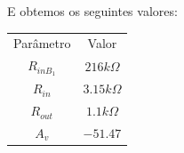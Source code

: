 E obtemos os seguintes valores:

\begin{center}
    \begin{tabular}{ |c|c| }
        \hline
        Parâmetro   & Valor              \\
        $R_{inB_1}$ & $216 k \varOmega$  \\
        $R_{in}$    & $3.15 k \varOmega$ \\
        $R_{out}$   & $1.1k \varOmega$   \\
        $A_v$       & $-51.47$           \\
        \hline
    \end{tabular}
\end{center}
